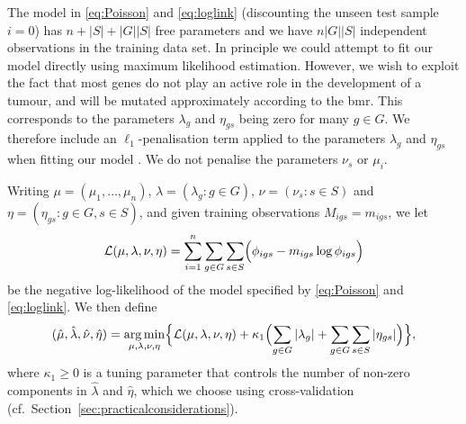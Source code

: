 \documentclass[12pt]{article}
\DeclareMathOperator*{\argmin}{arg\,min}
\begin{document}
The model in \eqref{eq:Poisson} and \eqref{eq:loglink} (discounting the unseen test sample $i=0$) has $n + |S| + |G||S|$ free parameters and we have $n|G||S|$ independent observations in the training data set. In principle we could attempt to fit our model directly using maximum likelihood estimation. However, we wish to exploit the fact that most genes do not play an active role in the development of a tumour, and will be mutated approximately according to the \acrshort{bmr}. This corresponds to the parameters $\lambda_g$ and $\eta_{gs}$ being zero for many $g \in G$. We therefore include an $\ell_1$-penalisation term applied to the parameters $\lambda_g$ and $\eta_{gs}$ when fitting our model \citep[see, for example,][]{van_de_geer_high-dimensional_2008}. We do not penalise the parameters $\nu_s$ or $\mu_i$.%

Writing $\mu = (\mu_1,\ldots, \mu_n)$, $\lambda = (\lambda_g :g \in G)$, $\nu = (\nu_s: s \in S)$ and $\eta = (\eta_{gs}: g\in G, s\in S)$, and given training observations $M_{igs} = m_{igs}$, we let
\[
\mathcal{L}(\mu, \lambda, \nu, \eta) = \sum_{i = 1}^n \sum_{g \in G} \sum_{s \in S} \Bigl( \phi_{igs} - m_{igs} \log \phi_{igs} \Bigr) 
\]
be the negative log-likelihood of the model specified by \eqref{eq:Poisson} and \eqref{eq:loglink}. We then define
\begin{equation}
(\hat{\mu}, \hat{\lambda}, \hat{\nu}, \hat{\eta}) = \argmin_{\mu,\lambda, \nu, \eta} \Bigl\{ \mathcal{L}(\mu, \lambda, \nu, \eta) + \kappa_1 \Bigl(\sum_{g \in G} |\lambda_g|  +  \sum_{g \in G} \sum_{s \in S} |\eta_{gs}| \Bigr) \Bigr\},
\label{eq:genparams}
\end{equation}
where $\kappa_1 \geq 0$ is a tuning parameter that controls the number of non-zero components in $\hat{\lambda}$ and $\hat{\eta}$, which we choose using cross-validation (cf.~Section~\ref{sec:practicalconsiderations}). 
\end{document}
